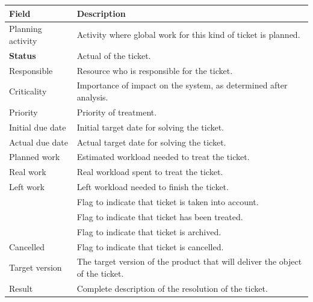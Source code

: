 \documentclass[letterpaper,10pt,english]{sphinxmanual}
\begin{document}
\begin{tabulary}{\linewidth}{|l|l|}
\hline
\textsf{\relax 
Field
} & \textsf{\relax 
Description
}\\
\hline
Planning activity
 & 
Activity where global work for this kind of ticket is planned.
\\
\hline
\textbf{Status}
 & 
Actual {\hyperref[Glossary:term-status]{\emph{}}} of the ticket.
\\
\hline
Responsible
 & 
Resource who is responsible for the ticket.
\\
\hline
Criticality
 & 
Importance of impact on the system, as determined after analysis.
\\
\hline
Priority
 & 
Priority of treatment.
\\
\hline
Initial due date
 & 
Initial target date for solving the ticket.
\\
\hline
Actual due date
 & 
Actual target date for solving the ticket.
\\
\hline
Planned work
 & 
Estimated workload needed to treat the ticket.
\\
\hline
Real work
 & 
Real workload spent to treat the ticket.
\\
\hline
Left work
 & 
Left workload needed to finish the ticket.
\\
\hline
{\hyperref[Glossary:term-handled]{\emph{}}}
 & 
Flag to indicate that ticket is taken into account.
\\
\hline
{\hyperref[Glossary:term-done]{\emph{}}}
 & 
Flag to indicate that ticket has been treated.
\\
\hline
{\hyperref[Glossary:term-closed]{\emph{}}}
 & 
Flag to indicate that ticket is archived.
\\
\hline
Cancelled
 & 
Flag to indicate that ticket is cancelled.
\\
\hline
Target version
 & 
The target version of the product that will deliver the object of the ticket.
\\
\hline
Result
 & 
Complete description of the resolution of the ticket.
\\
\hline\end{tabulary}
\end{document}

